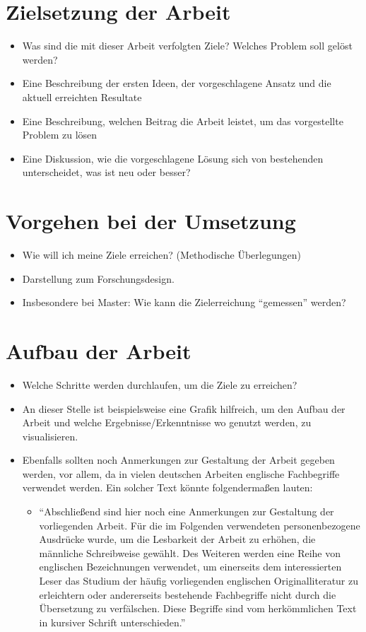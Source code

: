 \section{Zielsetzung der Arbeit}
\begin{itemize}
	\item Was sind die mit dieser Arbeit verfolgten Ziele? Welches Problem soll gelöst werden?
	\item Eine Beschreibung der ersten Ideen, der vorgeschlagene Ansatz und die aktuell erreichten Resultate 
	\item Eine Beschreibung, welchen Beitrag die Arbeit leistet, um das vorgestellte Problem zu lösen
	\item Eine Diskussion, wie die vorgeschlagene Lösung sich von bestehenden unterscheidet, was ist neu oder besser?
\end{itemize}

\section{Vorgehen bei der Umsetzung}
\begin{itemize}
	\item Wie will ich meine Ziele erreichen? (Methodische Überlegungen)
	\item Darstellung zum Forschungsdesign.
	\item Insbesondere bei Master: Wie kann die Zielerreichung ``gemessen'' werden? 
\end{itemize}  	

\section{Aufbau der Arbeit}
\begin{itemize}
	\item Welche Schritte werden durchlaufen, um die Ziele zu erreichen?
	\item An dieser Stelle ist beispielsweise eine Grafik hilfreich, um den Aufbau der Arbeit und welche Ergebnisse/Erkenntnisse wo genutzt werden, zu visualisieren. 
	\item Ebenfalls sollten noch Anmerkungen zur Gestaltung der Arbeit gegeben werden, vor allem, da in vielen deutschen Arbeiten englische Fachbegriffe verwendet werden. Ein solcher Text könnte folgendermaßen lauten: 
		\begin{itemize}
			\item ``Abschließend sind hier noch eine Anmerkungen zur Gestaltung der vorliegenden Arbeit. Für die im Folgenden verwendeten personenbezogene Ausdrücke wurde, um die Lesbarkeit der Arbeit zu erhöhen, die männliche Schreibweise gewählt. Des Weiteren werden eine Reihe von englischen Bezeichnungen verwendet, um einerseits dem interessierten Leser das Studium der häufig vorliegenden englischen Originalliteratur zu erleichtern oder andererseits bestehende Fachbegriffe nicht durch die Übersetzung zu verfälschen. Diese Begriffe sind vom herkömmlichen Text in kursiver Schrift unterschieden.''
		\end{itemize}
\end{itemize}

